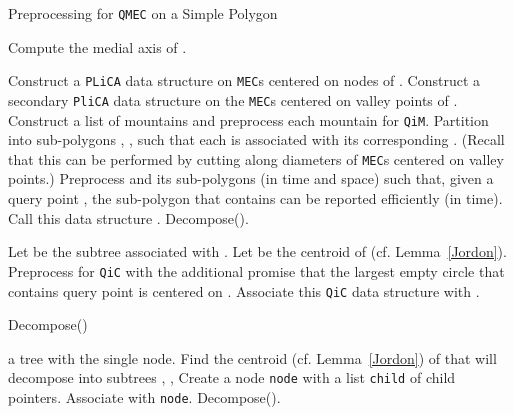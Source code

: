 \documentclass[12pt]{llncs}
\begin{document}
\begin{algorithm}[h!]
\caption{Preprocessing for {\tt QMEC} on a Simple Polygon }
\label{alg:qmecSP}
\begin{algorithmic}[1]
\STATE Compute the medial axis  of .

\STATE Construct a {\tt PLiCA} data structure on {\tt MEC}s centered on nodes of .
\STATE Construct a secondary {\tt PliCA} data structure on the {\tt MEC}s centered on 
valley points of .
\STATE Construct a list  of mountains and preprocess each 
mountain for {\tt QiM}.
\STATE Partition  into sub-polygons , ,  such that each  
is associated with its corresponding . (Recall that this can be performed by 
cutting along diameters of {\tt MEC}s centered on valley points.) 
\STATE Preprocess   and its sub-polygons (in  time and 
space) such that, given a query point , the sub-polygon that contains  can be 
reported efficiently (in  time). Call this data structure . \label{lno:easy}
\STATE  Decompose(). \label{lno:decompose}

 \label{lno:for}
\STATE Let  be the subtree associated with .
\STATE Let  be the centroid of  (cf. Lemma\ \ref{Jordon}).
\STATE Preprocess  for {\tt QiC} with the additional promise that 
the largest empty circle  that contains query point  is centered on 
. Associate this {\tt QiC} data structure with . \label{lno:qic}
\ENDFOR \label{lno:endfor}

\end{algorithmic}
\end{algorithm}

\begin{algorithm}[h!]
\caption{Decompose()}
\label{alg:decompose}
\begin{algorithmic}[1]
\IF{}
\RETURN a tree with the single node.
\ENDIF
\STATE Find the centroid (cf. Lemma\ \ref{Jordon}) of  that will decompose  
into subtrees , , 
\STATE Create a  node {\tt node} with a list {\tt child} of child pointers.
\STATE Associate  with {\tt node}.
  Decompose().
\ENDFOR
\end{algorithmic}
\end{algorithm}
\end{document}
